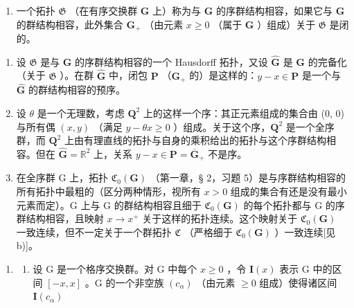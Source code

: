 \BourbakiExerciseGroup

\begin{enumerate}
\def\labelenumi{\arabic{enumi})}
\tightlist
\item
  一个拓扑 \(\mathfrak{G}\) （在有序交换群 \(\mathbf{G}\) 上）称为与 \(\mathbf{G}\) 的序群结构相容，如果它与 \(\mathbf{G}\) 的群结构相容，此外集合 \(\mathbf{G}_{+}\) （由元素 \(x \geqslant 0\) （属于 \(\mathbf{G}\) ）组成）关于 \(\mathfrak{G}\) 是闭的。
\end{enumerate}

\begin{enumerate}
\def\labelenumi{\alph{enumi})}
\item
  设 \(\mathfrak{G}\) 是与 \(\mathbf{G}\) 的序群结构相容的一个 Hausdorff 拓扑，又设 \(\hat{\mathbf{G}}\) 是 \(\mathbf{G}\) 的完备化（关于 \(\mathfrak{G}\) ）。在群 \(\hat{\mathbf{G}}\) 中，闭包 \(\mathbf{P}\) （\(\mathbf{G}_{+}\) 的）是这样的：\(y - x \in \mathbf{P}\) 是一个与 \(\hat{\mathbf{G}}\) 的群结构相容的预序。
\item
  设 \(\theta\) 是一个无理数，考虑 \(\mathbf{Q}^2\) 上的这样一个序：其正元素组成的集合由 (0, 0) 与所有偶 \((x, y)\) （满足 \(y - \theta x \geqslant 0\) ）组成。关于这个序，\(\mathbf{Q}^2\) 是一个全序群，而 \(\mathbf{Q}^2\) 上由有理直线的拓扑与自身的乘积给出的拓扑与这个序群结构相容。但在 \(\hat{\mathbf{G}} = \mathbb{R}^2\) 上，关系 \(y - x \in \mathbf{P} = \overline{\mathbf{G}}_+\) 不是序。
\item
  在全序群 G 上，拓扑 \(\mathfrak{C}_{0}(\mathbf{G})\) （第一章，§ 2，习题 5）是与序群结构相容的所有拓扑中最粗的（区分两种情形，视所有 \(x > 0\) 组成的集合有还是没有最小元素而定）。G 上与 G 的群结构相容且细于 \(\mathfrak{C}_{0}(\mathbf{G})\) 的每个拓扑都与 G 的序群结构相容，且映射 \(x \to x^{+}\) 关于这样的拓扑连续。这个映射关于 \(\mathfrak{C}_{0}(\mathbf{G})\) 一致连续，但不一定关于一个群拓扑 \(\mathfrak{C}\) （严格细于 \(\mathfrak{C}_{0}(\mathbf{G})\) ）一致连续{[}见 b){]}。
\end{enumerate}

\begin{enumerate}
\def\labelenumi{\arabic{enumi})}
\setcounter{enumi}{1}
\tightlist
\item
  \begin{enumerate}
  \def\labelenumii{\alph{enumii})}
  \tightlist
  \item
    设 G 是一个格序交换群。对 G 中每个 \(x \geqslant 0\) ，令 \(\mathbf{I}(x)\) 表示 G 中的区间 \([-x, x]\) 。G 的一个非空族 \((c_{\alpha})\) （由元素 \(\geqslant 0\) 组成）使得诸区间 \(\mathbf{I}(c_{\alpha})\)
  \end{enumerate}
\end{enumerate}

